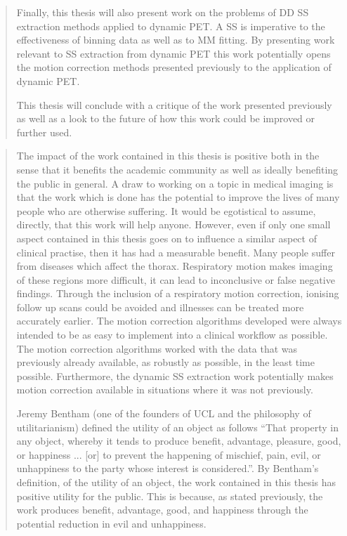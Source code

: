 \begin{abstract}
    Finally, this thesis will also present work on the problems of \gls{DD} \gls{SS} extraction methods applied to dynamic \gls{PET}. A \gls{SS} is imperative to the effectiveness of binning data as well as to \gls{MM} fitting. By presenting work relevant to \gls{SS} extraction from dynamic \gls{PET} this work potentially opens the motion correction methods presented previously to the application of dynamic \gls{PET}.

    This thesis will conclude with a critique of the work presented previously as well as a look to the future of how this work could be improved or further used.
\end{abstract}

\begin{impactstatement}
    \begin{quote}
        The impact of the work contained in this thesis is positive both in the sense that it benefits the academic community as well as ideally benefiting the public in general. A draw to working on a topic in medical imaging is that the work which is done has the potential to improve the lives of many people who are otherwise suffering. It would be egotistical to assume, directly, that this work will help anyone. However, even if only one small aspect contained in this thesis goes on to influence a similar aspect of clinical practise, then it has had a measurable benefit. Many people suffer from diseases which affect the thorax. Respiratory motion makes imaging of these regions more difficult, it can lead to inconclusive or false negative findings. Through the inclusion of a respiratory motion correction, ionising follow up scans could be avoided and illnesses can be treated more accurately earlier. The motion correction algorithms developed were always intended to be as easy to implement into a clinical workflow as possible. The motion correction algorithms worked with the data that was previously already available, as robustly as possible, in the least time possible. Furthermore, the dynamic \gls{SS} extraction work potentially makes motion correction available in situations where it was not previously.
        
        Jeremy Bentham (one of the founders of \gls{UCL} and the philosophy of utilitarianism) defined the utility of an object as follows ``That property in any object, whereby it tends to produce benefit, advantage, pleasure, good, or happiness ... [or] to prevent the happening of mischief, pain, evil, or unhappiness to the party whose interest is considered.''. By Bentham's definition, of the utility of an object, the work contained in this thesis has positive utility for the public. This is because, as stated previously, the work produces benefit, advantage, good, and happiness through the potential reduction in evil and unhappiness.


\end{quote}
\end{impactstatement}
